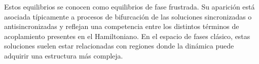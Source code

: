 Estos equilibrios se conocen como equilibrios de fase frustrada. Su aparición está asociada típicamente a procesos de bifurcación de las soluciones sincronizadas o antisincronizadas y reflejan una competencia entre los distintos términos de acoplamiento presentes en el Hamiltoniano. En el espacio de fases clásico, estas soluciones suelen estar relacionadas con regiones donde la dinámica puede adquirir una estructura más compleja.









